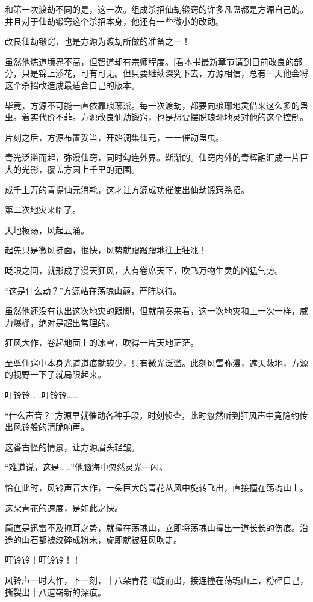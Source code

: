 \begin{this_body}
和第一次渡劫不同的是，这一次。组成杀招仙劫锻窍的许多凡蛊都是方源自己的。并且对于仙劫锻窍这个杀招本身，他还有一些微小的改动。

改良仙劫锻窍，也是方源为渡劫所做的准备之一！

虽然他炼道境界不高，但智道却有宗师程度。[看本书最新章节请到目前改良的部分，只是锦上添花，可有可无。但只要继续深究下去，方源相信，总有一天他会将这个杀招改造成最适合自己的版本。

毕竟，方源不可能一直依靠琅琊派。每一次渡劫，都要向琅琊地灵借来这么多的蛊虫。着实代价不菲。方源改良仙劫锻窍，也是想要摆脱琅琊地灵对他的这个控制。

片刻之后，方源布置妥当，开始调集仙元，一一催动蛊虫。

青光泛滥而起，弥漫仙窍，同时勾连外界。渐渐的。仙窍内外的青辉融汇成一片巨大的光影，覆盖方圆上千里的范围。

成千上万的青提仙元消耗，这才让方源成功催使出仙劫锻窍杀招。

第二次地灾来临了。

天地板荡，风起云涌。

起先只是微风拂面，很快，风势就蹭蹭蹭地往上狂涨！

眨眼之间，就形成了漫天狂风，大有卷席天下，吹飞万物生灵的凶猛气势。

“这是什么劫？”方源站在荡魂山巅，严阵以待。

虽然他还没有认出这次地灾的跟脚，但就前奏来看，这一次地灾和上一次一样，威力爆棚，绝对是超出常理的。

狂风大作，卷起地面上的冰雪，吹得一片天地茫茫。

至尊仙窍中本身光道道痕就较少，只有微光泛滥。此刻风雪弥漫，遮天蔽地，方源的视野一下子就局限起来。

叮铃铃……叮铃铃……

“什么声音？”方源早就催动各种手段，时刻侦查，此时忽然听到狂风声中竟隐约传出风铃般的清脆响声。

这番古怪的情景，让方源眉头轻皱。

“难道说，这是……”他脑海中忽然灵光一闪。

恰在此时，风铃声音大作，一朵巨大的青花从风中旋转飞出，直接撞在荡魂山上。

这朵青花的速度，是如此之快。

简直是迅雷不及掩耳之势，就撞在荡魂山，立即将荡魂山撞出一道长长的伤痕。沿途的山石都被绞碎成粉末，旋即就被狂风吹走。

叮铃铃！叮铃铃！！

风铃声一时大作，下一刻，十八朵青花飞旋而出，接连撞在荡魂山上，粉碎自己，撕裂出十八道崭新的深痕。


\end{this_body}
